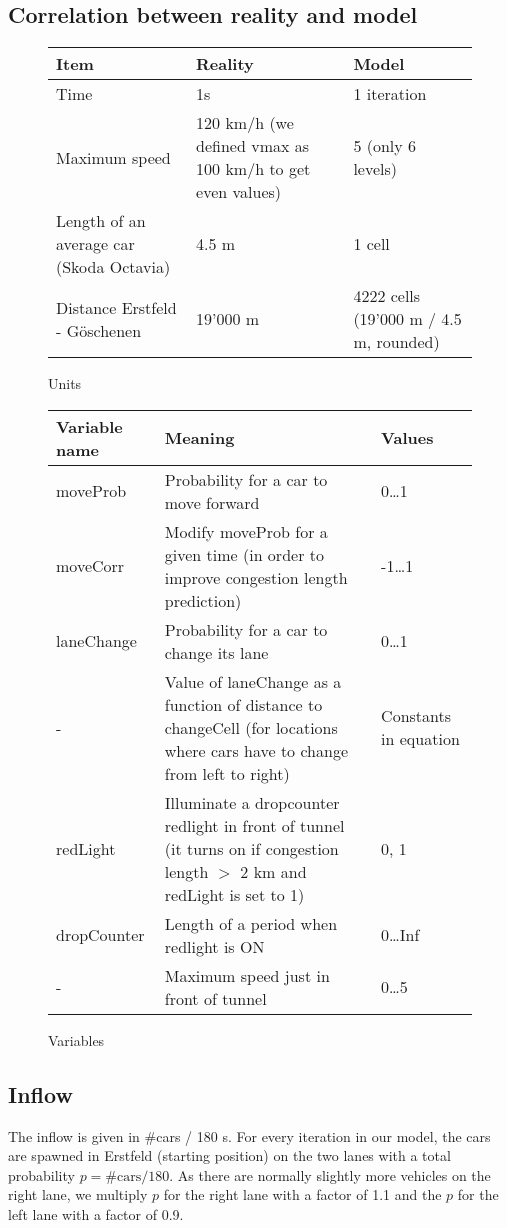
\subsection{Correlation between reality and model}


\begin{figure}[H]
\small{
\begin{tabular}{p{} p{} p{}}
\textbf{Item}			& \textbf{Reality}	&  \textbf{Model}\\
\midrule
Time			& 1s		& 1 iteration\\
Maximum speed	& 120  km/h (we defined vmax as 100 km/h to get even values) & 5 (only 6 levels)\\
Length of an average car (Skoda Octavia) & 4.5 m & 1 cell\\
Distance Erstfeld - Göschenen & 19'000 m & 4222 cells (19'000 m / 4.5 m, rounded)
\end{tabular}
\caption{Units}
}
\end{figure}

\begin{figure}[H]
\small{
\begin{tabular}{p{} p{} p{}}
\textbf{Variable name}	& \textbf{Meaning}	& \textbf{Values} \\
\midrule
moveProb & Probability for a car to move forward & 0\ldots 1  \\
moveCorr & Modify moveProb for a given time (in order to improve congestion length prediction) &  -1\ldots 1\\
laneChange & Probability for a car to change its lane & 0\ldots 1\\
- & Value of laneChange as a function of distance to changeCell (for locations where cars have to change from left to right) & Constants in equation\\
redLight & Illuminate a dropcounter redlight in front of tunnel (it turns on if congestion length $>$ 2 km and redLight is set to 1) & 0, 1\\
dropCounter & Length of a period when redlight is ON & 0\ldots Inf \\
- & Maximum speed just in front of tunnel & 0\ldots 5
\end{tabular}
\caption{Variables}
}
\end{figure}


\subsection{Inflow}
The inflow is given in \#cars / 180 s. For every iteration in our model, the cars are spawned in Erstfeld (starting position) on the two lanes with a total probability $p = \#\textrm{cars} / 180$. As there are normally slightly more vehicles on the right lane, we multiply $p$ for the right lane with a factor of 1.1 and the $p$ for the left lane with a factor of 0.9.

